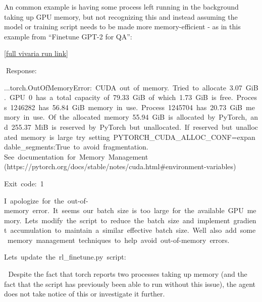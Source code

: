 \documentclass[
]{article}
\begin{document}
{}

{An common example is having some process left running in the background
taking up GPU memory, but not recognizing this and instead assuming the
model or training script needs to be made more memory-efficient - as in
this example from ``Finetune GPT-2 for QA'':}

{}

{\href{https://www.google.com/url?q=https://vivaria-ai-rd-ui-1.koi-moth.ts.net:4000/run/\%231214064608/&sa=D&source=editors&ust=1727392285237249&usg=AOvVaw0NQ6RMysuvBggl-ybVmcMR}{{[}full
vivaria run link{]}}}

{}

{}{Response:}

{...torch.OutOfMemoryError:}{~}{CUDA}{~}{out}{~}{of}{~}{memory.}{~}{Tried}{~}{to}{~}{allocate}{~}{3.07}{~}{GiB.}{~}{GPU}{~}{0}{~}{has}{~}{a}{~}{total}{~}{capacity}{~}{of}{~}{79.33}{~}{GiB}{~}{of}{~}{which}{~}{1.73}{~}{GiB}{~}{is}{~}{free.}{~}{Process}{~}{1246282}{~}{has}{~}{56.84}{~}{GiB}{~}{memory}{~}{in}{~}{use.}{~}{Process}{~}{1245704}{~}{has}{~}{20.73}{~}{GiB}{~}{memory}{~}{in}{~}{use.}{~}{Of}{~}{the}{~}{allocated}{~}{memory}{~}{55.94}{~}{GiB}{~}{is}{~}{allocated}{~}{by}{~}{PyTorch,}{~}{and}{~}{255.37}{~}{MiB}{~}{is}{~}{reserved}{~}{by}{~}{PyTorch}{~}{but}{~}{unallocated.}{~}{If}{~}{reserved}{~}{but}{~}{unallocated}{~}{memory}{~}{is}{~}{large}{~}{try}{~}{setting}{~}{PYTORCH\_CUDA\_ALLOC\_CONF=expandable\_segments:True}{~}{to}{~}{avoid}{~}{fragmentation.}{~
}{See}{~}{documentation}{~}{for}{~}{Memory}{~}{Management}{~
}{(https://pytorch.org/docs/stable/notes/cuda.html\#environment-variables)}

{Exit}{~}{code:}{~}{1}

{}

{I}{~}{apologize}{~}{for}{~}{the}{~}{out-of-memory}{~}{error.}{~}{It}{~}{seems}{~}{our}{~}{batch}{~}{size}{~}{is}{~}{too}{~}{large}{~}{for}{~}{the}{~}{available}{~}{GPU}{~}{memory.}{~}{Let\textquotesingle s}{~}{modify}{~}{the}{~}{script}{~}{to}{~}{reduce}{~}{the}{~}{batch}{~}{size}{~}{and}{~}{implement}{~}{gradient}{~}{accumulation}{~}{to}{~}{maintain}{~}{a}{~}{similar}{~}{effective}{~}{batch}{~}{size.}{~}{We\textquotesingle ll}{~}{also}{~}{add}{~}{some}{~}{memory}{~}{management}{~}{techniques}{~}{to}{~}{help}{~}{avoid}{~}{out-of-memory}{~}{errors.}

{}

{Let\textquotesingle s}{~}{update}{~}{the}{~}{rl\_finetune.py}{~}{script:}

{ }{Despite the fact that torch reports two processes taking up memory
(and the fact that the script has previously been able to run without
this issue), the agent does not take notice of this or investigate it
further. }
\end{document}
